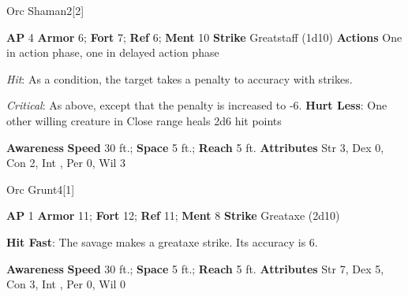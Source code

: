 \begin{monsection}{Orc Shaman}{2}[2]
\vspace{-1em}\vspace{-1em}
\begin{spellcontent}
\begin{spelltargetinginfo}
{\textbf{AP} 4}
\pari \textbf{Armor} 6;
\textbf{Fort} 7;
\textbf{Ref} 6;
\textbf{Ment} 10
\pari \textbf{Strike} Greatstaff  (1d10)
\pari \textbf{Actions} One in action phase, one in delayed action phase
\end{spelltargetinginfo}
\begin{spelleffects}
\pari
{}
\par
\par \textit{Hit}: As a condition, the target takes a  penalty to accuracy with strikes.
\par \textit{Critical}: As above, except that the penalty is increased to -6.
\vspace{0.5em}
\pari
\textbf{Hurt Less}:
One other willing creature in Close range heals 2d6 hit points
\end{spelleffects}
\end{spellcontent}
\begin{spellsubcontent}
\begin{spellfooter}
\pari \textbf{Awareness} 
\pari \textbf{Speed} 30 ft.;
\textbf{Space} 5 ft.;
\textbf{Reach} 5 ft.
\pari \textbf{Attributes}
Str 3,
Dex 0,
Con 2,
Int ,
Per 0,
Wil 3
\end{spellfooter}
\end{spellsubcontent}
\end{monsection}
\begin{monsection}{Orc Grunt}{4}[1]
\vspace{-1em}\vspace{-1em}
\begin{spellcontent}
\begin{spelltargetinginfo}
{\textbf{AP} 1}
\pari \textbf{Armor} 11;
\textbf{Fort} 12;
\textbf{Ref} 11;
\textbf{Ment} 8
\pari \textbf{Strike} Greataxe  (2d10)
\end{spelltargetinginfo}
\begin{spelleffects}
\pari
\textbf{Hit Fast}:
The savage makes a greataxe strike.
Its accuracy is 6.
\end{spelleffects}
\end{spellcontent}
\begin{spellsubcontent}
\begin{spellfooter}
\pari \textbf{Awareness} 
\pari \textbf{Speed} 30 ft.;
\textbf{Space} 5 ft.;
\textbf{Reach} 5 ft.
\pari \textbf{Attributes}
Str 7,
Dex 5,
Con 3,
Int ,
Per 0,
Wil 0
\end{spellfooter}
\end{spellsubcontent}
\end{monsection}
